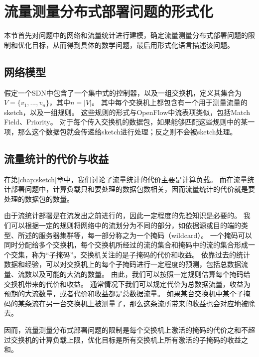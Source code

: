 

\section{流量测量分布式部署问题的形式化}

本节首先对问题中的网络和流量统计进行建模，确定流量测量分布式部署问题的限制和优化目标，从而得到具体的数学问题，最后用形式化语言描述该问题。

\subsection{网络模型}
假定一个SDN中包含了一个集中式的控制器，以及一组交换机，定义其集合为$V=\{v_1, ..., v_n\} $，其中$ n = |V| $。
其中每个交换机上都包含有一个用于测量流量的sketch，以及一组规则。
这些规则的形式与OpenFlow\cite{pfaff2012openflow}中流表项类似，包括Match Field、Priority。
对于每个传入交换机的数据包，如果能够匹配这些规则中的某一项，那么这个数据包就会传递给sketch进行处理；反之则不会被sketch处理。

\subsection{流量统计的代价与收益}
在第\ref{chap:sketch}章中，我们讨论了流量统计的代价主要是计算负载。
而在流量统计部署问题中，计算负载只和要处理的数据包数相关，因而流量统计的代价就是要处理的数据包的数量。

由于流统计部署是在流发出之前进行的，因此一定程度的先验知识是必要的。
我们可以根据一定的规则将网络中的流划分为不同的部分，如依据源或目的端的类型、所述的服务器集群等，每一部分称之为一个掩码（wildcard）\cite{xu2017miniming}。
一个掩码可以同时分配给多个交换机，每个交换机所经过的流的集合和掩码中的流的集合形成一个交集，称为“子掩码”。交换机关注的是子掩码的代价和收益。
依靠过去的统计数据和经验，可以对交换机上的每个子掩码进行一定程度的预测，包括总数据流量、流数以及可能的大流的数量。
由此，我们可以按照一定规则估算每个掩码给交换机带来的代价和收益。
通常情况下我们可以规定代价为总数据流量，收益为预期的大流数量，或者代价和收益都是总数据流量。
如果某台交换机中某个子掩码的某条流在另一台交换机上被测量了，那么这条流所带来的收益也会对应地被除去。

因而，流量测量分布式部署问题的限制是每个交换机上激活的掩码的代价之和不超过交换机的计算负载上限，优化目标是所有交换机上所有激活的子掩码的收益之和。

